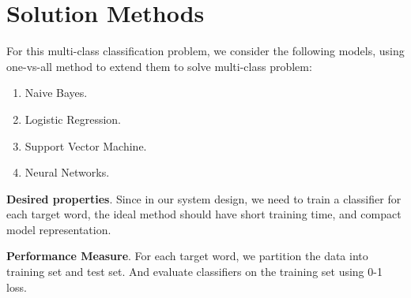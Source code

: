 \section{Solution Methods}

For this multi-class classification problem, we consider the following models,
using one-vs-all method to extend them to solve multi-class problem:

\begin{enumerate}
  \item Naive Bayes.
  \item Logistic Regression.
  \item Support Vector Machine.
  \item Neural Networks.
\end{enumerate}

\textbf{Desired properties}. Since in our system design, we need to train a
classifier for each target word, the ideal method should have short training
time, and compact model representation.

\textbf{Performance Measure}. For each target word, we partition the data into
training set and test set. And evaluate classifiers on the training set using
0-1 loss.
